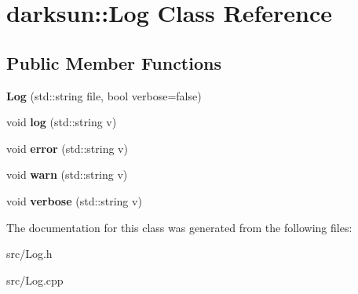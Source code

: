 \hypertarget{classdarksun_1_1_log}{}\section{darksun\+::Log Class Reference}
\label{classdarksun_1_1_log}
\subsection*{Public Member Functions}
\begin{DoxyCompactItemize}
\item 
\mbox{\label{classdarksun_1_1_log_ae06bfdf1cb975d60539b0cc4d4cec702}} 
{\bfseries Log} (std\+::string file, bool verbose=false)
\item 
\mbox{\label{classdarksun_1_1_log_a65a7671f98d040ff774af7d734255498}} 
void {\bfseries log} (std\+::string v)
\item 
\mbox{\label{classdarksun_1_1_log_abe0605546ab1803959eb72d085c52def}} 
void {\bfseries error} (std\+::string v)
\item 
\mbox{\label{classdarksun_1_1_log_a0d71ad9b560fd589862fccd44c3ef00b}} 
void {\bfseries warn} (std\+::string v)
\item 
\mbox{\label{classdarksun_1_1_log_aaf110c4ff423b7b85fed7674600ca26a}} 
void {\bfseries verbose} (std\+::string v)
\end{DoxyCompactItemize}


The documentation for this class was generated from the following files\+:\begin{DoxyCompactItemize}
\item 
src/Log.\+h\item 
src/Log.\+cpp\end{DoxyCompactItemize}
